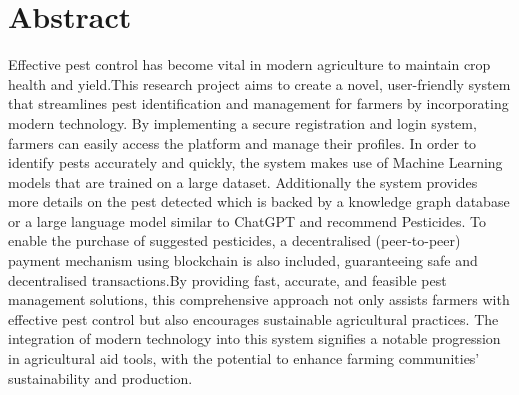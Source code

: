 \chapter*{\Large \center Abstract}

Effective pest control has become vital in modern agriculture to maintain crop health and yield.This research project aims to create a novel, user-friendly system that streamlines pest identification and management for farmers by incorporating modern technology. By implementing a secure registration and login system, farmers can easily access the platform and manage their profiles. In order to identify pests accurately and quickly, the system makes use of Machine Learning models that are trained on a large dataset.
Additionally the system provides more details on the pest detected which is backed by a knowledge graph database or a large language model similar to ChatGPT and recommend Pesticides. To enable the purchase of suggested pesticides, a decentralised (peer-to-peer) payment mechanism using blockchain is also included, guaranteeing safe and decentralised transactions.By providing fast, accurate, and feasible pest management solutions, this comprehensive approach not only assists farmers with effective pest control but also encourages sustainable agricultural practices. The integration of modern technology into this system signifies a notable progression in agricultural aid tools, with the potential to enhance farming communities' sustainability and production.

